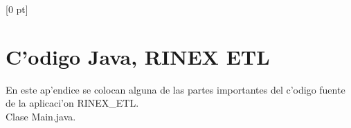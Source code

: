 \titlespacing{\chapter}{0 pt}{30 pt}{50 pt}[0 pt]
\titleformat{\section}{\Large\bfseries}{\thesection}{0 pt}{\hspace{30 pt}}
\titleformat{\subsection}{\large\bfseries}{\thesubsection}{0 pt}{\hspace{30 pt}}
\pagestyle{fancy}
\fancyhead[LO,LE]{\footnotesize\emph{\leftmark}}
\fancyhead[RO,RE]{\thepage}
\fancyfoot[CO,CE]{}

\chapter{C'odigo Java, RINEX ETL} %

\normalsize
En este ap'endice se colocan alguna de las partes importantes del c'odigo fuente de la aplicaci'on RINEX\_ETL.\\

Clase Main.java. \\

\lstset{language=Java}

